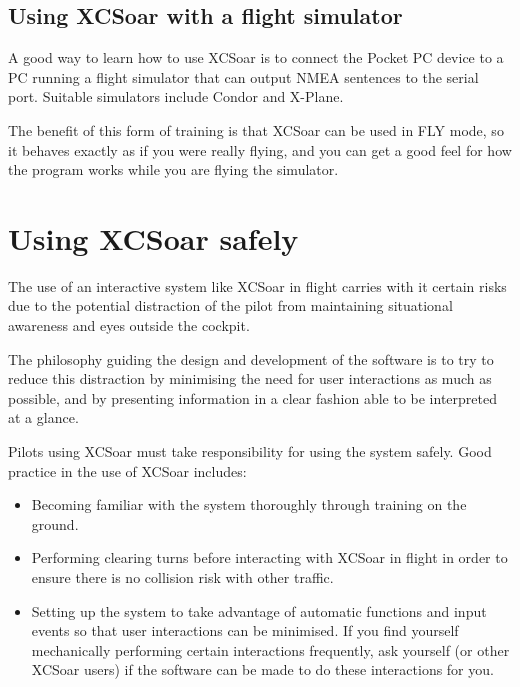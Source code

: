 \subsection*{Using XCSoar with a flight simulator}
A good way to learn how to use XCSoar is to connect the Pocket PC
device to a PC running a flight simulator that can output NMEA
sentences to the serial port. Suitable simulators include Condor and
X-Plane.  

The benefit of this form of training is that XCSoar can be used in FLY
mode, so it behaves exactly as if you were really flying, and you can
get a good feel for how the program works while you are flying the
simulator.

\section{Using XCSoar safely}\label{sec:usingxcsoarsafely}\label{conf:usingxcsoarsafely}
The use of an interactive system like XCSoar in flight carries with it
certain risks due to the potential distraction of the pilot from
maintaining situational awareness and eyes outside the cockpit.

The philosophy guiding the design and development of the software is
to try to reduce this distraction by minimising the need for user
interactions as much as possible, and by presenting information in a
clear fashion able to be interpreted at a glance.

Pilots using XCSoar must take responsibility for using the system safely.
Good practice in the use of XCSoar includes:
\begin{itemize}
\item Becoming familiar with the system thoroughly through training on 
  the ground.
\item Performing clearing turns before interacting with XCSoar in flight
  in order to ensure there is no collision risk with other traffic.
\item Setting up the system to take advantage of automatic functions
  and input events so that user interactions can be minimised.  If you
  find yourself mechanically performing certain interactions frequently,
  ask yourself (or other XCSoar users) if the software can be made to do 
  these interactions for you.
\end{itemize}

